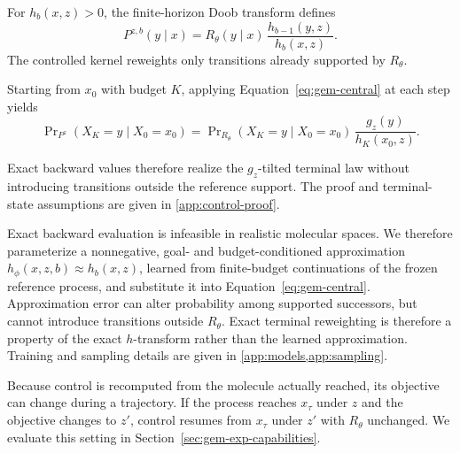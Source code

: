 For $h_b(x,z)>0$, the finite-horizon Doob transform defines
\begin{equation}
  P^{z,b}(y\mid x)
  =
  R_\theta(y\mid x)\,
  \frac{h_{b-1}(y,z)}{h_b(x,z)} .
  \label{eq:gem-central}
\end{equation}
The controlled kernel reweights only transitions already supported by
$R_\theta$.

\begin{proposition}
\label{prop:gem-doob}
Starting from $x_0$ with budget $K$, applying
Equation~\eqref{eq:gem-central} at each step yields
\[
  \Pr\nolimits_{P^z}(X_K=y\mid X_0=x_0)
  =
  \Pr\nolimits_{R_\theta}(X_K=y\mid X_0=x_0)\,
  \frac{g_z(y)}{h_K(x_0,z)} .
\]
\end{proposition}

Exact backward values therefore realize the $g_z$-tilted terminal law without
introducing transitions outside the reference support. The proof and
terminal-state assumptions are given in \cref{app:control-proof}.

Exact backward evaluation is infeasible in realistic molecular spaces. We
therefore parameterize a nonnegative, goal- and budget-conditioned
approximation $h_\phi(x,z,b)\approx h_b(x,z)$, learned from finite-budget
continuations of the frozen reference process, and substitute it into
Equation~\eqref{eq:gem-central}.
Approximation error can alter probability among supported successors, but cannot
introduce transitions outside $R_\theta$. Exact terminal reweighting is
therefore a property of the exact $h$-transform rather than the learned
approximation. Training and sampling details are given in \cref{app:models,app:sampling}.

Because control is recomputed from the molecule actually reached, its objective
can change during a trajectory. If the process reaches $x_\tau$ under $z$ and the
objective changes to $z'$, control resumes from $x_\tau$ under $z'$ with
$R_\theta$ unchanged. We evaluate this setting in
Section~\ref{sec:gem-exp-capabilities}.
